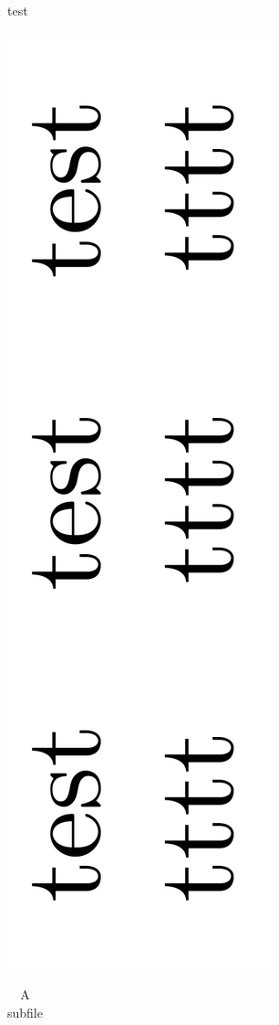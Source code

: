 \documentclass{article}
\begin{document}
test

\begin{table}

	\caption{A subfile}
	\includegraphics{subfile.png}
	\begin{tabular}{c}
	\end{tabular}

\end{table}
\end{document}
